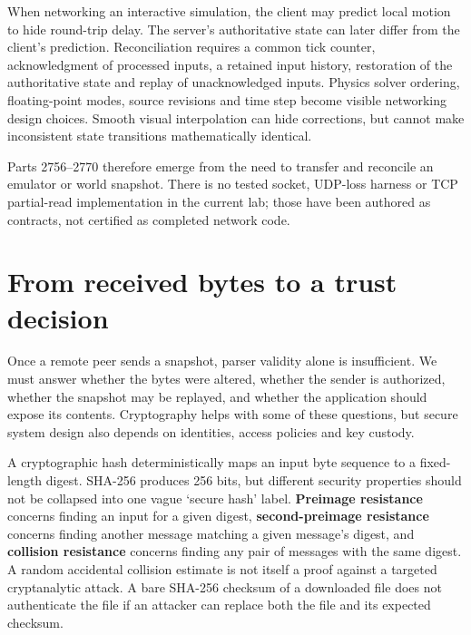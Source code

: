 When networking an interactive simulation, the client may predict local motion to hide round-trip delay. The server's authoritative state can later differ from the client's prediction. Reconciliation requires a common tick counter, acknowledgment of processed inputs, a retained input history, restoration of the authoritative state and replay of unacknowledged inputs. Physics solver ordering, floating-point modes, source revisions and time step become visible networking design choices. Smooth visual interpolation can hide corrections, but cannot make inconsistent state transitions mathematically identical.

Parts 2756--2770 therefore emerge from the need to transfer and reconcile an emulator or world snapshot. There is no tested socket, UDP-loss harness or TCP partial-read implementation in the current lab; those have been authored as contracts, not certified as completed network code.

\section{From received bytes to a trust decision}\label{01-foundations-i-ch016-from-received-bytes-to-a-trust-decision}

\hypertarget{01-foundations-i-ch016-from-received-bytes-to-a-trust-decision}{}

Once a remote peer sends a snapshot, parser validity alone is insufficient. We must answer whether the bytes were altered, whether the sender is authorized, whether the snapshot may be replayed, and whether the application should expose its contents. Cryptography helps with some of these questions, but secure system design also depends on identities, access policies and key custody.

A cryptographic hash deterministically maps an input byte sequence to a fixed-length digest. SHA-256 produces 256 bits, but different security properties should not be collapsed into one vague `secure hash' label. \textbf{Preimage resistance} concerns finding an input for a given digest, \textbf{second-preimage resistance} concerns finding another message matching a given message's digest, and \textbf{collision resistance} concerns finding any pair of messages with the same digest. A random accidental collision estimate is not itself a proof against a targeted cryptanalytic attack. A bare SHA-256 checksum of a downloaded file does not authenticate the file if an attacker can replace both the file and its expected checksum.

